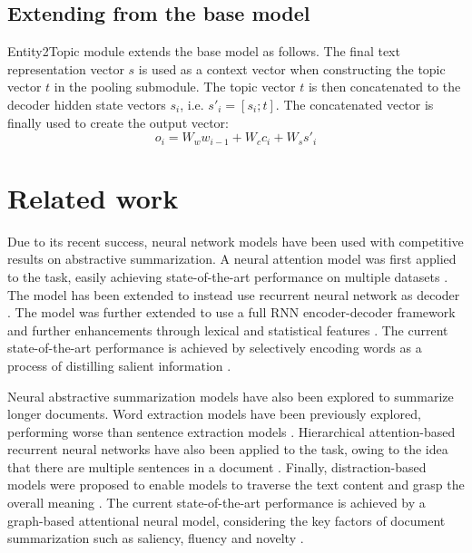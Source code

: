 \documentclass[11pt,a4paper]{article}
\begin{document}
\subsection{Extending from the base model}

Entity2Topic module extends the base model as follows. The final text representation vector $s$ is used as a context vector when constructing the topic vector $t$ in the pooling submodule. The topic vector $t$ is then concatenated to the decoder hidden state vectors $s_i$, i.e. $s'_i = [s_i; t]$. The concatenated vector is finally used to create the output vector:
\begin{equation}
    o_i = W_w w_{i-1} + W_c c_i + W_s s'_i \nonumber
\end{equation}

\section{Related work}



Due to its recent success, neural network models have been used with competitive results on abstractive summarization. A neural attention model was first applied to the task, easily achieving state-of-the-art performance on multiple datasets \cite{rush2015neural}. The model has been extended to instead use recurrent neural network as decoder \cite{chopra2016abstractive}. The model was further extended to use a full RNN encoder-decoder framework and further enhancements through lexical and statistical features \cite{nallapati2016abstractive}. The current state-of-the-art performance is achieved by selectively encoding words as a process of distilling salient information \cite{zhou2017selective}.

Neural abstractive summarization models have also been explored to summarize longer documents. Word extraction models
have been previously explored, performing worse than sentence extraction models \cite{cheng2016neural}. Hierarchical attention-based recurrent neural networks have also been applied to the task, owing to the idea that there are multiple sentences in a document \cite{nallapati2016abstractive}. Finally, distraction-based models were proposed to enable models to traverse the text content and grasp the overall meaning \cite{chen2016distraction}. The current state-of-the-art performance is achieved by a graph-based attentional neural model, considering the key factors of document summarization such as saliency, fluency and novelty \cite{tan2017abstractive}.
\end{document}
